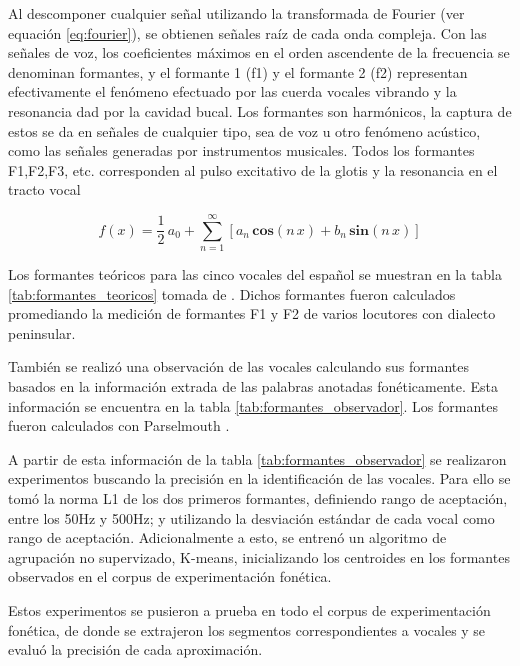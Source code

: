 Al descomponer cualquier señal utilizando la transformada de Fourier (ver equación \ref{eq:fourier}), se obtienen señales raíz de cada onda compleja. Con las señales de voz, los coeficientes máximos  en el orden ascendente de la frecuencia se denominan formantes, y el formante 1 (f1) y el formante 2 (f2) representan efectivamente el fenómeno efectuado por las cuerda vocales vibrando y la resonancia dad por la cavidad bucal. Los formantes son harmónicos, la captura de estos se da en señales de cualquier tipo, sea de voz u otro fenómeno acústico, como las señales generadas por instrumentos musicales. Todos los formantes F1,F2,F3, etc. corresponden al pulso excitativo de la glotis y la resonancia en el tracto vocal

\begin{equation}
\label{eq:fourier}    
f(x) = \frac{1}{2} \, a_{0} + \sum_{n=1}^{\infty} \left[
   a_{n}\,\mathbf{cos} (n\,x) + b_{n} \,\mathbf{sin} (n\,x) \right]
\end{equation}

Los formantes teóricos para las cinco vocales del español se muestran en la tabla \ref{tab:formantes_teoricos} tomada de \cite{Bradlow1995}. Dichos formantes fueron calculados promediando la medición de formantes F1 y F2 de varios locutores con dialecto peninsular.



También se realizó una observación de las vocales calculando sus formantes basados en la información extrada de las palabras anotadas fonéticamente. Esta información se encuentra en la tabla \ref{tab:formantes_observador}. Los formantes fueron calculados con Parselmouth \cite{parselmouth}.



A partir de esta información de la tabla \ref{tab:formantes_observador} se realizaron experimentos buscando la precisión en la identificación de las vocales. Para ello se tomó la norma L1 \cite{manhatattan_distance} de los dos primeros formantes, definiendo rango de aceptación, entre los 50Hz y 500Hz; y utilizando la desviación estándar de cada vocal como rango de aceptación. Adicionalmente a esto, se entrenó un algoritmo de agrupación no supervizado, K-means, inicializando los centroides en los formantes observados en el corpus de experimentación fonética.

Estos experimentos se pusieron a prueba en todo el corpus de experimentación fonética, de donde se extrajeron los segmentos correspondientes a vocales y se evaluó la precisión de cada aproximación.

